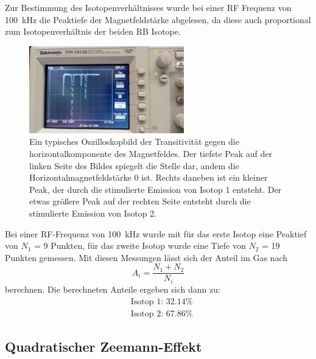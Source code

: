 		\noindent
		Zur Bestimmung des Isotopenverhältnisses wurde bei einer RF Frequenz von \SI{100}{\kilo\hertz} die Peaktiefe der Magnetfeldstärke abgelesen,
		da diese auch proportional zum Isotopenverhältnis der beiden RB Isotope.
		
		\begin{figure}[H]
			\centering
			\includegraphics[width=0.6\textwidth]{latex/images/Messbild.jpeg}
			\caption{Ein typisches Oszilloskopbild der Transitivität gegen die horizontalkomponente des Magnetfeldes. 
			Der tiefste Peak auf der linken Seite des Bildes spiegelt die Stelle dar, andem die Horizontalmagnetfeldstärke 0 ist.
			Rechts daneben ist ein kleiner Peak, der durch die stimulierte Emission von Isotop 1 entsteht. 
			Der etwas größere Peak auf der rechten Seite entsteht durch die stimulierte Emission von Isotop 2.}
		\end{figure}

		Bei einer RF-Frequenz von \SI{100}{\kilo\hertz} wurde mit für das erste Isotop eine Peaktief von $N_1$ = 9 Punkten, für das zweite Isotop wurde eine Tiefe von $N_2$ = 19 Punkten gemessen.
		Mit diesen Messungen lässt sich der Anteil im Gas nach 
		\begin{equation}
			A_i = \frac{N_1 + N_2}{N_i}
		\end{equation}
		berechnen.
		Die berechneten Anteile ergeben sich dann zu:
		\begin{align*}
			&\text{Isotop 1: } \num{32.14}\%\\
			&\text{Isotop 2: } \num{67.86}\%
		\end{align*}

	
	\subsection{Quadratischer Zeemann-Effekt}
